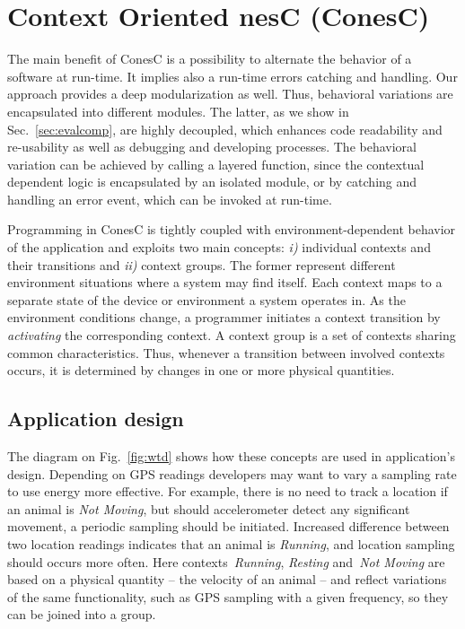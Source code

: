 
\section{Context Oriented nesC (ConesC)} 

The main benefit of ConesC is a possibility to alternate the behavior of a software at
run-time. It implies also a run-time errors catching and handling. Our approach
provides a deep modularization as well. Thus, behavioral variations are encapsulated
into different modules. The latter, as we show in Sec.~\ref{sec:evalcomp},
are highly decoupled, which enhances code readability and re-usability as well as debugging
and developing processes. The behavioral variation can be achieved by calling a
layered function, since the contextual dependent logic is encapsulated by an isolated module, or
by catching and handling an error event, which can be invoked at run-time.

Programming in ConesC is tightly coupled with environment-dependent behavior of
the application and exploits two main concepts: \emph{i)} individual contexts
and their transitions and \emph{ii)} context groups. The former represent
different environment situations where a system may find itself. Each context
maps to a separate state of the device or environment a system operates in. As
the environment conditions change, a programmer initiates a context transition
by \emph{activating} the corresponding context. A context group is a set of contexts
sharing common characteristics. Thus, whenever a transition between involved
contexts occurs, it is determined by changes in one or more physical quantities.

\subsection{Application design}

The diagram on Fig.~\ref{fig:wtd} shows how these concepts are used in application's design.
Depending on GPS readings developers may want to vary a sampling rate to use energy
more effective. For example, there is no need to
track a location if an animal is \emph{Not Moving}, but should accelerometer detect any
significant movement, a periodic sampling should be initiated. Increased
difference between two location readings indicates that an animal is
\emph{Running}, and location sampling should occurs more often.
Here contexts~\emph{Running}, \emph{Resting} and~\emph{Not Moving} are based on
a physical quantity -- the velocity of an animal -- and reflect
variations of the same functionality, such as GPS sampling with a given frequency,
so they can be joined into a group.

